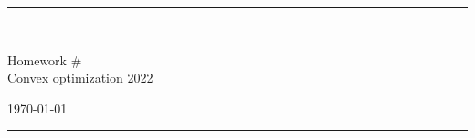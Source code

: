 \fancyhead[C]{}
\hrule \medskip
\begin{minipage}{0.295\textwidth} 
\raggedright
\footnotesize
\yourname \hfill\\
\youremail
\end{minipage}
\begin{minipage}{0.4\textwidth} 
\centering 
\large 
Homework \# \assignmentnumber\\ 
\normalsize 
Convex optimization 2022\\ 
\end{minipage}
\begin{minipage}{0.295\textwidth} 
\raggedleft
\today\hfill\\
\end{minipage}
\medskip\hrule 
\bigskip

